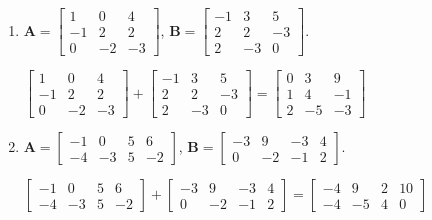 \documentclass[11pt]{article}
\begin{document}
\begin{enumerate}[label=\textbf{\arabic*.}]
	\begin{enumerate}[label=\textbf{\alph*)}]
		\item $\textbf{A} = 
		\begin{bmatrix}
			1 & 0 & 4 \\
			-1 & 2 & 2 \\
			0 & -2 & -3
		\end{bmatrix}$, $\textbf{B} =
		\begin{bmatrix}
			-1 & 3 & 5 \\
			2 & 2 & -3 \\
			2 & -3 & 0
		\end{bmatrix}$.
	
		$\begin{bmatrix}
			1 & 0 & 4 \\
			-1 & 2 & 2 \\
			0 & -2 & -3
		\end{bmatrix} +
		\begin{bmatrix}
			-1 & 3 & 5 \\
			2 & 2 & -3 \\
			2 & -3 & 0
		\end{bmatrix} = 
		\begin{bmatrix}
			0 & 3 & 9 \\
			1 & 4 & -1 \\
			2 & -5 & -3
		\end{bmatrix}$
	
		\item $\textbf{A} = 
		\begin{bmatrix}
			-1 & 0 & 5 & 6 \\
			-4 & -3 & 5 & -2
		\end{bmatrix}$, $\textbf{B} =
		\begin{bmatrix}
			-3 & 9 & -3 & 4 \\
			0 & -2 & -1 & 2
		\end{bmatrix}$.
	
		$\begin{bmatrix}
			-1 & 0 & 5 & 6 \\
			-4 & -3 & 5 & -2
		\end{bmatrix} +
		\begin{bmatrix}
			-3 & 9 & -3 & 4 \\
			0 & -2 & -1 & 2
		\end{bmatrix} =
		\begin{bmatrix}
			-4 & 9 & 2 & 10 \\
			-4 & -5 & 4 & 0
		\end{bmatrix}$
	\end{enumerate}


\end{enumerate}
\end{document}
